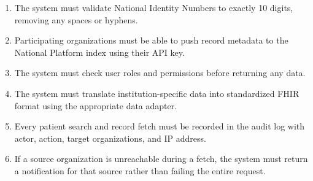 \documentclass[12pt]{report}
\numberwithin{equation}{chapter}
\begin{document}
\begin{enumerate}
    \item The system must validate National Identity Numbers to exactly 10 digits, removing any spaces or hyphens.
    \item Participating organizations must be able to push record metadata to the National Platform index using their API key.
    \item The system must check user roles and permissions before returning any data.
    \item The system must translate institution-specific data into standardized FHIR format using the appropriate data adapter.
    \item Every patient search and record fetch must be recorded in the audit log with actor, action, target organizations, and IP address.
    \item If a source organization is unreachable during a fetch, the system must return a notification for that source rather than failing the entire request.
\end{enumerate}
\end{document}
